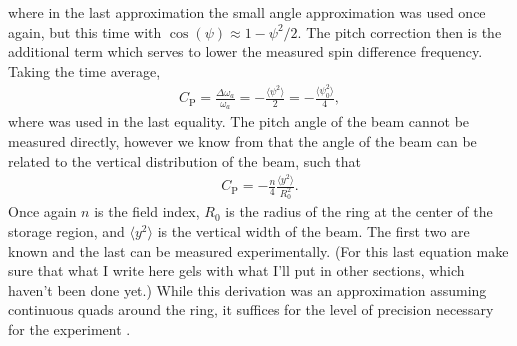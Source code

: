 where in the last approximation the small angle approximation was used once again, but this time with $\cos(\psi) \approx 1 - \psi^{2}/2$. The pitch correction then is the additional term which serves to lower the measured spin difference frequency. Taking the time average,
        \begin{align}
            C_{\text{P}} = \frac{\Delta\omega_{a}}{\omega_{a}} = - \frac{\langle \psi^{2} \rangle}{2} = - \frac{\langle \psi_{0}^{2} \rangle}{4},
        \end{align}
where  was used in the last equality. The pitch angle of the beam cannot be measured directly, however we know from  that the angle of the beam can be related to the vertical distribution of the beam, such that 
        \begin{align}
            C_{\text{P}} = - \frac{n}{4} \frac{\langle y^{2} \rangle}{R_{0}^{2}}.
        \end{align}
Once again $n$ is the field index, $R_{0}$ is the radius of the ring at the center of the storage region, and $\langle y^{2} \rangle$ is the vertical width of the beam. The first two are known and the last can be measured experimentally. (For this last equation make sure that what I write here gels with what I'll put in other sections, which haven't been done yet.) While this derivation was an approximation assuming continuous quads around the ring, it suffices for the level of precision necessary for the \gmtwo experiment \cite{something}.










\clearpage





